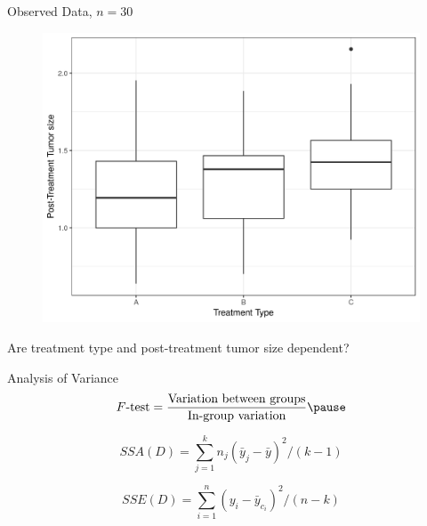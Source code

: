 \documentclass{beamer}
\newcommand{\sse}{\textit{SSE}\xspace}
\newcommand{\ssa}{\textit{SSA}\xspace}
\begin{document}
\begin{frame}{Observed Data, $n=30$}
\pause
\begin{figure}
  \includegraphics[scale=0.5]{simulation/observed-plot}
\end{figure}
\pause
Are treatment type and post-treatment tumor size dependent?
\end{frame}

\begin{frame}{Analysis of Variance}
\pause
\begin{equation*}
F\text{-test} = \frac{\text{Variation between groups}}{\text{In-group variation}} \pause 
\end{equation*}

\begin{equation*}
\ssa(D) = \sum_{j=1}^{k} n_j (\bar{y}_j - \bar{y})^2/(k-1)
\end{equation*}

\begin{equation*}
\sse(D) = \sum_{i=1}^{n}  (y_{i}-\bar{y}_{c_i})^2/(n-k)
\end{equation*}
\end{frame}
\end{document}
